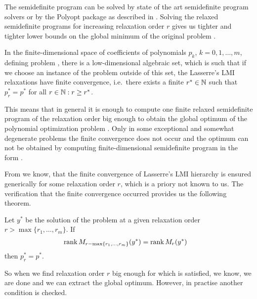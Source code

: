 The semidefinite program  can be solved by state of the art semidefinite program solvers or by the Polyopt package as described in .
Solving the relaxed semidefinite programs for increasing relaxation order $r$ gives us tighter and tighter lower bounds on the global minimum of the original problem .

\begin{theorem}
  In the finite-dimensional space of coefficients of polynomials $p_k$, $k = 0, 1, \ldots, m$, defining problem , there is a low-dimensional algebraic set, which is such that if we choose an instance of the problem  outside of this set, the Lasserre's LMI relaxations have finite convergence, i.e.\ there exists a finite $r^*\in\mathbb{N}$ such that $p^*_r=p^*$ for all $r\in\mathbb{N}: r\geq r^*$.
\end{theorem}

This means that in general it is enough to compute one finite relaxed semidefinite program  of the relaxation order big enough to obtain the global optimum of the polynomial optimization problem .
Only in some exceptional and somewhat degenerate problems the finite convergence does not occur and the optimum can not be obtained by computing finite-dimensional semidefinite program in the form .

From  we know, that the finite convergence of Lasserre's LMI hierarchy is ensured generically for some relaxation order $r$, which is a priory not known to us.
The verification that the finite convergence occurred provides us the following theorem.

\begin{theorem}
  Let $y^*$ be the solution of the problem  at a given relaxation order $r > \max\{r_1,\ldots,r_m\}$.
  If
  \begin{align}
    \operatorname{rank} M_{r-\max\{r_1,\ldots,r_m\}}(y^*) &= \operatorname{rank} M_r(y^*)
  \end{align}
  then $p^*_r = p^*$.
\end{theorem}

So when we find relaxation order $r$ big enough for which  is satisfied, we know, we are done and we can extract the global optimum.
However, in practise another condition is checked.

